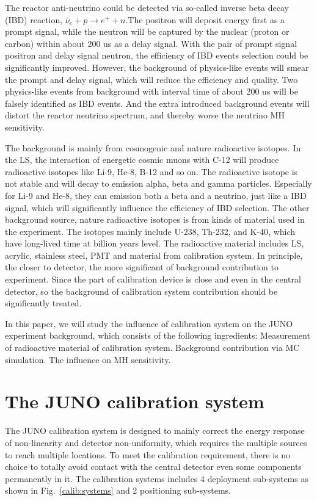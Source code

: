 \documentclass[review,number,sort&compress]{elsarticle}
\begin{document}
The reactor anti-neutrino could be detected via so-called inverse beta decay (IBD) reaction, $\bar{\nu}_{e}+p \rightarrow e^{+}+n $.The positron will deposit energy first as a prompt signal, while the neutron will be captured by the nuclear (proton or carbon) within about 200 us as a delay signal. 
With the pair of prompt signal positron and delay signal neutron, the efficiency of IBD events selection could be significantly improved. 
However, the background of physics-like events will smear the prompt and delay signal, which will reduce the efficiency and quality.
Two physics-like events from background with interval time of about 200 us will be falsely identified as IBD events.
And the extra introduced background events will distort the reactor neutrino spectrum, and thereby worse the neutrino MH sensitivity. 

The background is mainly from cosmogenic and nature radioactive isotopes.
In the LS, the interaction of energetic cosmic muons with C-12 will produce radioactive isotopes like Li-9, He-8, B-12 and so on.
The radioactive isotope is not stable and will decay to emission alpha, beta and gamma particles.
Especially for Li-9 and He-8, they can emission both a beta and a neutrino, just like a IBD signal, which will significantly influence the efficiency of IBD selection.  
The other background source, nature radioactive isotopes is from kinds of material used in the experiment.
The isotopes mainly include U-238, Th-232, and K-40, which have long-lived time at billion years level.
The radioactive material includes LS, acrylic, stainless steel, PMT and material from calibration system.
In principle, the closer to detector, the more significant of background contribution to experiment.
Since the part of calibration device is close and even in the central detector, so the background of calibration system contribution should be significantly treated. 

In this paper, we will study the influence of calibration system on the JUNO experiment background, which consists of the following ingredients: 
\noindent
Measurement of radioactive material of calibration system.
\noindent
Background contribution via MC simulation.
\noindent
The influence on MH sensitivity.

\section{The JUNO calibration system}

The JUNO calibration system is designed 
to mainly correct the energy response of non-linearity 
and detector non-uniformity, which requires the multiple 
sources to reach multiple locations.
To meet the calibration requirement, there is no choice to totally avoid contact with the central detector even some components permanently in it.
The calibration systems includes 4 deployment sub-systems as shown in Fig.~\ref{calib:systems} and 2 positioning sub-systems. 
\end{document}
